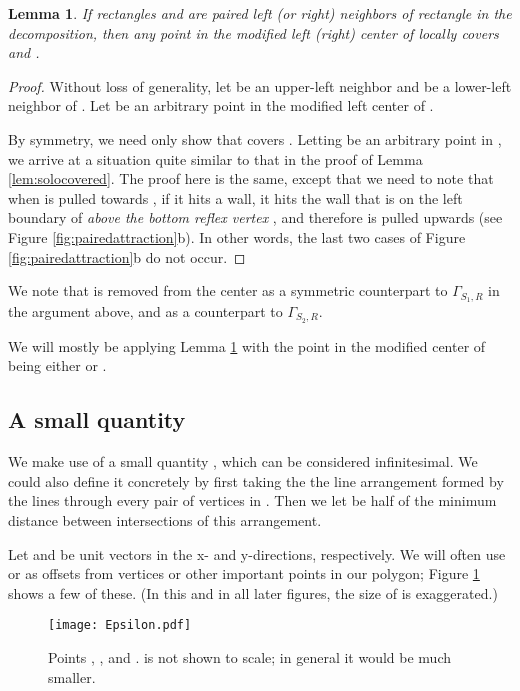 \documentclass{article}
\newtheorem{lemma}{Lemma}
\newcommand{\curl}[2]{\ensuremath{\Gamma_{#1, #2}}}
\begin{document}
	\begin{lemma}\label{lem:pairedcovered}
		If rectangles  and  are paired left (or right) neighbors of
		rectangle  in the decomposition, then any point in the modified left (right) center
		of  locally covers  and .
	\end{lemma}
	\begin{proof}
		Without loss of generality, let  be an upper-left neighbor and  be a
		lower-left neighbor of .
		Let  be an arbitrary point in the modified left center of .
		
		By symmetry, we need only show that  covers .
		Letting  be an arbitrary point in , we arrive at a situation
		quite similar to that in the proof of Lemma \ref{lem:solocovered}.
		The proof here is the same, except that we need to note that when  is pulled
		towards , if it hits a wall, it hits the wall that is on the left boundary of 
		\emph{above the bottom reflex vertex }, and therefore is pulled upwards
		(see Figure \ref{fig:pairedattraction}b).  In other words, the last two cases
		of Figure \ref{fig:pairedattraction}b do not occur.
	\end{proof}
	
	We note that  is removed from the center as a symmetric counterpart to
	\curl{S_1}{R} in the argument above, and  as a counterpart to
	\curl{S_2}{R}.
	
	We will mostly be applying Lemma
	\ref{lem:pairedcovered} with the point in the modified center of  being
	either  or .
	
	
	\subsection{A small quantity}
	We make use of a small quantity , which can be considered
	infinitesimal.
	We could also define it concretely by first taking the the line arrangement
	formed by the lines through every pair of vertices in .
	Then we let  be half of the minimum distance between
	intersections of this arrangement.
	
	Let  and  be unit vectors
	in the x- and y-directions, respectively.
	We will often use  or  as offsets from
	vertices or other important points in our polygon; Figure \ref{fig:epsilon}
	shows a few of these.
	(In this and in all later figures, the size of  is exaggerated.)
	
	\begin{figure}[htbp] 
		\begin{center}
		    \texttt{[image: Epsilon.pdf]}
		\end{center}
		\caption{
			Points , , and .
			 is not shown to scale; in
			general it would be much smaller.
		}
		\label{fig:epsilon}
	\end{figure}
	
\end{document}
